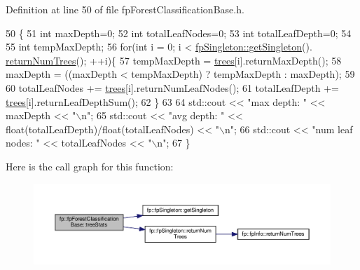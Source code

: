 Definition at line 50 of file fp\+Forest\+Classification\+Base.\+h.


\begin{DoxyCode}
50                             \{
51                 \textcolor{keywordtype}{int} maxDepth=0;
52                 \textcolor{keywordtype}{int} totalLeafNodes=0;
53                 \textcolor{keywordtype}{int} totalLeafDepth=0;
54 
55                 \textcolor{keywordtype}{int} tempMaxDepth;
56                 \textcolor{keywordflow}{for}(\textcolor{keywordtype}{int} i = 0; i < \hyperlink{classfp_1_1fpSingleton_a8bdae77b68521003e3fc630edec2e240}{fpSingleton::getSingleton}().
      \hyperlink{classfp_1_1fpSingleton_a8be36616345b6b77ce4c60b99cc2b91c}{returnNumTrees}(); ++i)\{
57                     tempMaxDepth = \hyperlink{classfp_1_1fpForestClassificationBase_a51482a6c95c4b3cb42627f029c2d4662}{trees}[i].returnMaxDepth();
58                     maxDepth = ((maxDepth < tempMaxDepth) ? tempMaxDepth : maxDepth);
59 
60                     totalLeafNodes += \hyperlink{classfp_1_1fpForestClassificationBase_a51482a6c95c4b3cb42627f029c2d4662}{trees}[i].returnNumLeafNodes();
61                     totalLeafDepth += \hyperlink{classfp_1_1fpForestClassificationBase_a51482a6c95c4b3cb42627f029c2d4662}{trees}[i].returnLeafDepthSum();
62                 \}
63 
64                 std::cout << \textcolor{stringliteral}{"max depth: "} << maxDepth << \textcolor{stringliteral}{"\(\backslash\)n"};
65                 std::cout << \textcolor{stringliteral}{"avg depth: "} << float(totalLeafDepth)/float(totalLeafNodes) << \textcolor{stringliteral}{"\(\backslash\)n"};
66                 std::cout << \textcolor{stringliteral}{"num leaf nodes: "} << totalLeafNodes << \textcolor{stringliteral}{"\(\backslash\)n"};
67             \}
\end{DoxyCode}
Here is the call graph for this function\+:
\nopagebreak
\begin{figure}[H]
\begin{center}
\leavevmode
\includegraphics[width=350pt]{classfp_1_1fpForestClassificationBase_a48567d379434daeccb1540c84674d286_cgraph}
\end{center}
\end{figure}


